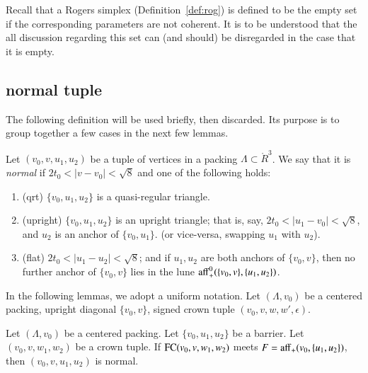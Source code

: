 \begin{remark}
Recall that a Rogers simplex (Definition~\ref{def:rog}) is defined to be the
empty set 
if the corresponding parameters are not coherent.  It is to
be understood that the all discussion regarding this set
can (and should) be disregarded in the case that it is empty.
\end{remark}



\subsection{normal tuple}


The following definition will be used briefly, then discarded.
Its purpose is to group together a few cases in the next
few lemmas.

\begin{definition}  Let $(v_0,v,u_1,u_2)$ be a tuple of vertices
in a packing $\Lambda\subset\ring{R}^3$.  We say that it is {\it normal} if $2t_0<|v-v_0|<\sqrt8$
and one of the
following holds:
\begin{enumerate}
  \item (qrt) $\{v_0,u_1,u_2\}$ is a quasi-regular triangle.
  \item (upright) $\{v_0,u_1,u_2\}$ is an upright triangle; that is, say,
    $2t_0 < |u_1-v_0| < \sqrt8$, and $u_2$ is an anchor of $\{v_0,u_1\}$.
    (or vice-versa, swapping $u_1$ with $u_2$).
  \item (flat)
   $2t_0<|u_1-u_2|<\sqrt8$; and if $u_1,u_2$ are both anchors of
   $\{v_0,v\}$, 
   then
    no further anchor of $\{v_0,v\}$
   lies in the lune ${\operatorname{aff}}^0_+(\{v_0,v\},\{u_1,u_2\})$.
\end{enumerate}
\end{definition}



In the following lemmas, we adopt a uniform notation.  Let $(\Lambda,v_0)$ be a centered packing, upright diagonal 
$\{v_0,v\}$, signed crown tuple
$(v_0,v,w,w',\epsilon)$.

\begin{lemma}
Let $(\Lambda,v_0)$ be a centered packing.  Let $\{v_0,u_1,u_2\}$
be a barrier.  Let $(v_0,v,w_1,w_2)$ be a crown tuple.  If
${\operatorname{FC}}(v_0,v,w_1,w_2)$ meets $F={\operatorname{aff}}_+(v_0,\{u_1,u_2\})$, then
$(v_0,v,u_1,u_2)$ is normal.
\end{lemma}

